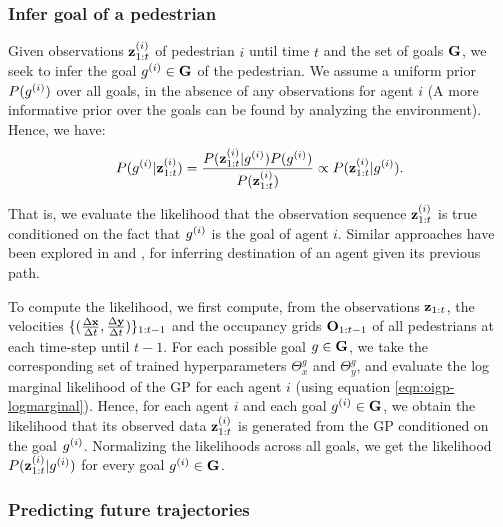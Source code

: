 \subsubsection{Infer goal of a pedestrian}
\label{sec:oigp-infer}

Given observations $\mathbf{z}^{(i)}_{1:t}$ of pedestrian $i$ until time $t$
and the set of goals $\mathbf{G}$, we seek to infer the goal
$g^{(i)} \in \mathbf{G}$ of the pedestrian. We assume a uniform prior
$P(g^{(i)})$ over all goals, in the absence of any observations for
agent $i$ (A more informative prior over the goals can be found by
analyzing the environment). Hence, we have:
\begin{equation}
  \label{eq:oigp-1}
  P(g^{(i)}|\mathbf{z}^{(i)}_{1:t}) = \frac{P(\mathbf{z}^{(i)}_{1:t}|g^{(i)}) P(g^{(i)})}{P(\mathbf{z}^{(i)}_{1:t})} \propto P(\mathbf{z}^{(i)}_{1:t}|g^{(i)}).
\end{equation}

That is, we evaluate the likelihood that the observation sequence
$\mathbf{z}^{(i)}_{1:t}$ is true conditioned on the fact that $g^{(i)}$ is
the goal of agent $i$. Similar approaches have been explored in
\cite{kitani2012activity} and \cite{ziebart09}, for inferring destination of an
agent given its previous path.
 
%
%
%
%
%
%
%
%
%
To compute the likelihood, we first compute, from the observations
$\mathbf{z}_{1:t}$, the velocities $\{(\frac{\Delta \mathbf{x}}{\Delta t}, \frac{\Delta \mathbf{y}}{\Delta t})\}_{1:t-1}$ and the
occupancy grids $\mathbf{O}_{1:t-1}$ of all pedestrians at each time-step
until $t-1$.  For each possible goal $g \in \mathbf{G}$, we take the
corresponding set of trained hyperparameters $\Theta_x^g$ and
$\Theta_y^g$, and evaluate the log marginal likelihood of the GP for
each agent $i$ (using equation \ref{eqn:oigp-logmarginal}).
%
%
%
%
Hence, for each agent $i$ and each goal $g^{(i)} \in \mathbf{G}$, we obtain
the likelihood that its observed data $\mathbf{z}^{(i)}_{1:t}$ is generated
from the GP conditioned on the goal $g^{(i)}$. Normalizing the
likelihoods across all goals, we get the likelihood
$P(\mathbf{z}_{1:t}^{(i)}|g^{(i)})$ for every goal $g^{(i)} \in \mathbf{G}$.


\subsubsection{Predicting future trajectories}
\label{sec:oigp-pred-future-traj}

